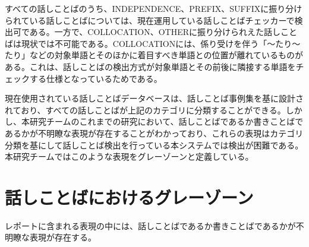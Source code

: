 すべての話しことばのうち、INDEPENDENCE、PREFIX、SUFFIXに振り分けられている話しことばについては、現在運用している話しことばチェッカーで検出可である。一方で、COLLOCATION、OTHERに振り分けられえた話しことばは現状では不可能である。COLLOCATIONには、係り受けを伴う「～たり～たり」などの対象単語とそのほかに着目すべき単語との位置が離れているものがある。これは、話しことばの検出方式が対象単語とその前後に隣接する単語をチェックする仕様となっているためである。

現在使用されている話しことばデータベースは、話しことば事例集を基に設計されており、すべての話しことばが上記のカテゴリに分類することができる。しかし、本研究チームのこれまでの研究において、話しことばであるか書きことばであるかが不明瞭な表現が存在することがわかっており、これらの表現はカテゴリ分類を基にして話しことば検出を行っている本システムでは検出が困難である。本研究チームではこのような表現をグレーゾーンと定義している。

\section{話しことばにおけるグレーゾーン}
レポートに含まれる表現の中には、話しことばであるか書きことばであるかが不明瞭な表現が存在する。



